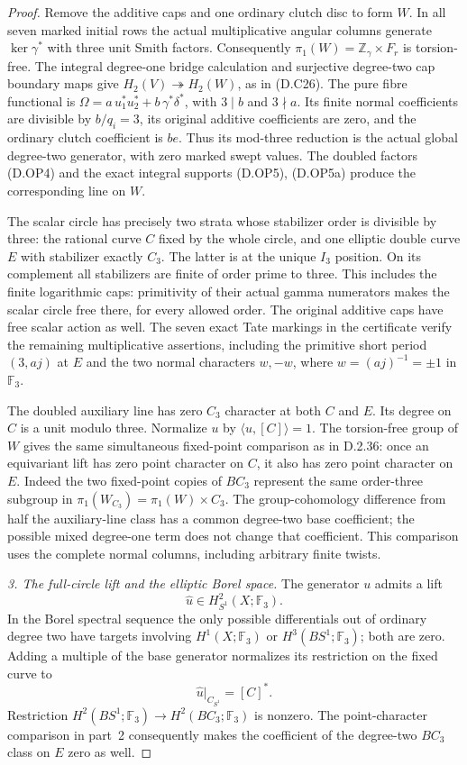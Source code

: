 \begin{proof}
Remove the additive caps and one ordinary clutch disc to form $W$.
In all seven marked initial rows the actual multiplicative angular
columns generate $\ker\gamma^*$ with three unit Smith factors.
Consequently $\pi_1(W)=\mathbb Z_\gamma\times F_r$ is torsion-free.
The integral degree-one bridge calculation and surjective degree-two
cap boundary maps give $H_2(V)\twoheadrightarrow H_2(W)$, as in
(D.C26). The pure fibre functional is
$\Omega=a\,u_1^*u_2^*+b\,\gamma^*\delta^*$, with $3\mid b$
and $3\nmid a$. Its finite normal coefficients are divisible by
$b/q_i=3$, its original additive coefficients are zero, and the
ordinary clutch coefficient is $be$. Thus its mod-three reduction
is the actual global degree-two generator, with zero marked swept
values. The doubled factors (D.OP4) and the exact integral supports
(D.OP5), (D.OP5a) produce the corresponding line on $W$.

The scalar circle has precisely two strata whose stabilizer order is
divisible by three: the rational curve $C$ fixed by the whole circle,
and one elliptic double curve $E$ with stabilizer exactly $C_3$.
The latter is at the unique $I_3$ position. On its complement all
stabilizers are finite of order prime to three. This includes the
finite logarithmic caps: primitivity of their actual gamma numerators
makes the scalar circle free there, for every allowed order.
The original additive caps have free scalar action as well.
The seven exact Tate markings in the certificate verify the remaining
multiplicative assertions, including the primitive short period
$(3,aj)$ at $E$ and the two normal characters
$w,-w$, where $w=(aj)^{-1}=\pm1$ in $\mathbb F_3$.

The doubled auxiliary line has zero $C_3$ character at both $C$ and
$E$. Its degree on $C$ is a unit modulo three. Normalize $u$ by
$\langle u,[C]\rangle=1$. The torsion-free group of $W$ gives the
same simultaneous fixed-point comparison as in D.2.36: once an
equivariant lift has zero point character on $C$, it also has zero
point character on $E$. Indeed the two fixed-point copies of $BC_3$
represent the same order-three subgroup in
$\pi_1(W_{C_3})=\pi_1(W)\times C_3$. The group-cohomology difference
from half the auxiliary-line class has a common degree-two base
coefficient; the possible mixed degree-one term does not change
that coefficient. This comparison uses the complete normal columns,
including arbitrary finite twists.

\emph{3. The full-circle lift and the elliptic Borel space.}
The generator $u$ admits a lift
\[
                 \widehat u\in H^2_{S^1}(X;\mathbb F_3).
\]
In the Borel spectral sequence the only possible differentials out
of ordinary degree two have targets involving $H^1(X;\mathbb F_3)$
or $H^3(BS^1;\mathbb F_3)$; both are zero. Adding a multiple of the
base generator normalizes its restriction on the fixed curve to
\[
                      \widehat u|_{C_{S^1}}=[C]^* .           \tag{D.T34}
\]
Restriction $H^2(BS^1;\mathbb F_3)\to H^2(BC_3;\mathbb F_3)$
is nonzero. The point-character comparison in part~2 consequently
makes the coefficient of the degree-two $BC_3$ class on $E$ zero
as well.


\end{proof}
